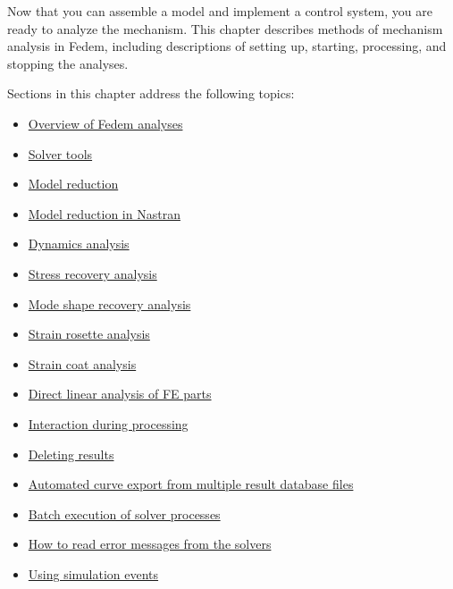 %
%

%
%


Now that you can assemble a model and implement a control system,
you are ready to analyze the mechanism.
This chapter describes methods of mechanism analysis in Fedem, including
descriptions of setting up, starting, processing, and stopping the analyses.

Sections in this chapter address the following topics:

\begin{itemize}
\item
  \protect\hyperlink{overview-of-fedem-analyses}
                    {Overview of Fedem analyses}
\item
  \protect\hyperlink{solver-tools}
                    {Solver tools}
\item
  \protect\hyperlink{model-reduction}
                    {Model reduction}
\item
  \protect\hyperlink{model-reduction-in-nastran}
                    {Model reduction in Nastran}
\item
  \protect\hyperlink{dynamics-analysis}
                    {Dynamics analysis}
\item
  \protect\hyperlink{stress-recovery-analysis}
                    {Stress recovery analysis}
\item
  \protect\hyperlink{mode-shape-recovery-analysis}
                    {Mode shape recovery analysis}
\item
  \protect\hyperlink{strain-rosette-analysis-1}
                    {Strain rosette analysis}
\item
  \protect\hyperlink{strain-coat-analysis-1}
                    {Strain coat analysis}
\item
  \protect\hyperlink{direct-linear-analysis-of-fe-parts}
                    {Direct linear analysis of FE parts}
\item
  \protect\hyperlink{interaction-during-processing}
                    {Interaction during processing}
\item
  \protect\hyperlink{deleting-results}
                    {Deleting results}
\item
  \protect\hyperlink{automated-curve-export-from-multiple-result-database-files}
                    {Automated curve export from multiple result database files}
\item
  \protect\hyperlink{batch-execution-of-solver-processes}
                    {Batch execution of solver processes}
\item
  \protect\hyperlink{how-to-read-error-messages-from-the-solvers}
                    {How to read error messages from the solvers}
\item
  \protect\hyperlink{using-simulation-events}
                    {Using simulation events}
\end{itemize}

